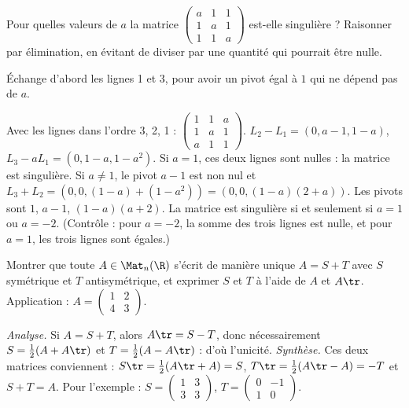 \begin{exo}
Pour quelles valeurs de $a$ la matrice $\begin{pmatrix}a&1&1\\1&a&1\\1&1&a\end{pmatrix}$ est-elle singulière ? Raisonner par élimination, en évitant de diviser par une quantité qui pourrait être nulle.
\begin{indication}
Échange d'abord les lignes 1 et 3, pour avoir un pivot égal à $1$ qui ne dépend pas de $a$.
\end{indication}
\begin{corrige}
Avec les lignes dans l'ordre 3, 2, 1 : $\begin{pmatrix}1&1&a\\1&a&1\\a&1&1\end{pmatrix}$. $L_2-L_1=(0,a-1,1-a)$, $L_3-aL_1=(0,1-a,1-a^2)$. Si $a=1$, ces deux lignes sont nulles : la matrice est singulière. Si $a\neq1$, le pivot $a-1$ est non nul et $L_3+L_2=(0,0,(1-a)+(1-a^2))=(0,0,(1-a)(2+a))$. Les pivots sont $1$, $a-1$, $(1-a)(a+2)$. La matrice est singulière si et seulement si $a=1$ ou $a=-2$. (Contrôle : pour $a=-2$, la somme des trois lignes est nulle, et pour $a=1$, les trois lignes sont égales.)
\end{corrige}
\end{exo}
\begin{exo}
Montrer que toute $A\in\Mat_n(\R)$ s'écrit de manière unique $A=S+T$ avec $S$ symétrique et $T$ antisymétrique, et exprimer $S$ et $T$ à l'aide de $A$ et $A\tr$. Application : $A=\begin{pmatrix}1&2\\4&3\end{pmatrix}$.
\begin{corrige}
\emph{Analyse.} Si $A=S+T$, alors $A\tr=S-T$, donc nécessairement $S=\frac12(A+A\tr)$ et $T=\frac12(A-A\tr)$ : d'où l'unicité. \emph{Synthèse.} Ces deux matrices conviennent : $S\tr=\frac12(A\tr+A)=S$, $T\tr=\frac12(A\tr-A)=-T$ et $S+T=A$. Pour l'exemple : $S=\begin{pmatrix}1&3\\3&3\end{pmatrix}$, $T=\begin{pmatrix}0&-1\\1&0\end{pmatrix}$.
\end{corrige}
\end{exo}

